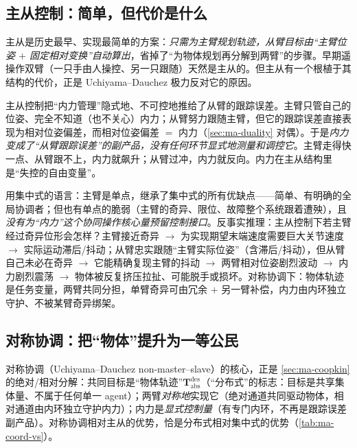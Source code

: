 \subsection{主从控制：简单，但代价是什么}
\label{sec:ma-masterslave}

主从是历史最早、实现最简单的方案：\emph{只需为主臂规划轨迹，从臂目标由“主臂位姿 $+$ 固定相对变换”自动算出}，省掉了“为物体规划再分解到两臂”的步骤。早期遥操作双臂（一只手由人操控、另一只跟随）天然是主从的。但主从有一个根植于其结构的代价，正是 Uchiyama--Dauchez 极力反对它的原因\cite{uchiyama1987symmetric}。

\begin{insight}[主从的结构性缺陷]
主从控制把“内力管理”隐式地、不可控地推给了从臂的跟踪误差。主臂只管自己的位姿、完全不知道（也不关心）内力；从臂努力跟随主臂，但它的跟踪误差直接表现为相对位姿偏差，而相对位姿偏差 $=$ 内力（\cref{sec:ma-duality} 对偶）。于是\emph{内力变成了“从臂跟踪误差”的副产品，没有任何环节显式地测量和调控它}。主臂走得快一点、从臂跟不上，内力就飙升；从臂过冲，内力就反向。内力在主从结构里是“失控的自由变量”。
\end{insight}

用集中式的语言：主臂是单点，继承了集中式的所有优缺点——简单、有明确的全局协调者；但也有单点的脆弱（主臂的奇异、限位、故障整个系统跟着遭殃），且\emph{没有为“内力”这个协同操作核心量预留控制接口}。反事实推理：主从控制下若主臂经过奇异位形会怎样？主臂接近奇异 $\to$ 为实现期望末端速度需要巨大关节速度 $\to$ 实际运动滞后/抖动；从臂忠实跟随“主臂实际位姿”（含滞后/抖动），但从臂自己未必在奇异 $\to$ 它能精确复现主臂的抖动 $\to$ 两臂相对位姿剧烈波动 $\to$ 内力剧烈震荡 $\to$ 物体被反复挤压拉扯、可能脱手或损坏。对称协调下：物体轨迹是任务变量，两臂共同分担，单臂奇异可由冗余 $+$ 另一臂补偿，内力由内环独立守护、不被某臂奇异绑架。

\subsection{对称协调：把“物体”提升为一等公民}
\label{sec:ma-coord}

对称协调（Uchiyama--Dauchez non-master--slave）的核心，正是 \cref{sec:ma-coopkin} 的绝对/相对分解\cite{uchiyama1993symmetric}：共同目标是“物体轨迹”$\mathbf{T}_{\text{abs}}^{\text{des}}$（“分布式”的标志：目标是共享集体量、不属于任何单一 agent）；两臂\emph{对称地}实现它（绝对通道共同驱动物体，相对通道由内环独立守护内力）；内力是\emph{显式控制量}（有专门内环，不再是跟踪误差副产品）。对称协调相对主从的优势，恰是分布式相对集中式的优势（\cref{tab:ma-coord-vs}）。


